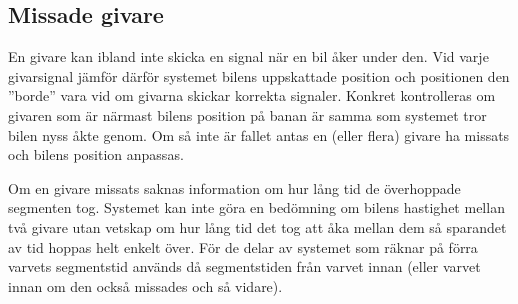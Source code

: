 \subsection{Missade givare}
\label{sec:missade givare}

En givare kan ibland inte skicka en signal när en bil åker under den. Vid varje
givarsignal jämför därför systemet bilens uppskattade position och positionen den
''borde'' vara vid om givarna skickar korrekta signaler. Konkret kontrolleras om
givaren som är närmast bilens position på banan är samma som systemet tror bilen
nyss åkte genom. Om så inte är fallet antas en (eller flera) givare ha missats
och bilens position anpassas.

Om en givare missats saknas information om hur lång tid de överhoppade segmenten
tog. Systemet kan inte göra en bedömning om bilens hastighet mellan två givare
utan vetskap om hur lång tid det tog att åka mellan dem så sparandet av tid
hoppas helt enkelt över. För de delar av systemet som räknar på förra varvets
segmentstid används då segmentstiden från varvet innan (eller varvet innan om
den också missades och så vidare).


